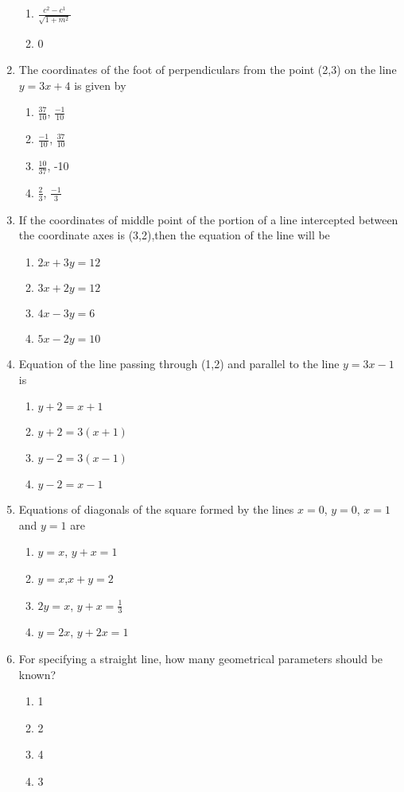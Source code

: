 \documentclass[12pt]{article}
\begin{document}
\begin{enumerate}[resume]
\begin{enumerate}
\item $\frac{c^2-c^1}{\sqrt{1+m^2}}$
\item 0
\end{enumerate}
\item The coordinates of the foot of perpendiculars from the point (2,3) on the line $y=3x+4$ is given by 
\begin{enumerate} 
\item $\frac{37}{10}$, $\frac{-1}{10}$
\item $\frac{-1}{10}$, $\frac{37}{10}$
\item $\frac{10}{37}$, -10
\item $\frac{2}{3}$, $\frac{-1}{3}$
\end{enumerate}
\item If the coordinates of middle point of the portion of a line intercepted between the coordinate axes is (3,2),then the equation of the line will be
\begin{enumerate}
\item $2x+3y=12$
\item $3x+2y=12$
\item $4x-3y=6$
\item $5x-2y=10$
\end{enumerate}
\item Equation of the line passing through (1,2) and parallel to the line $y=3x-1$ is
\begin{enumerate}
\item $y+2=x+1$
\item $y+2=3(x+1)$
\item $y-2=3(x-1)$
\item $y-2=x-1$
\end{enumerate}
\item Equations of diagonals of the square formed by the lines $x=0$, $y=0$, $x=1$ and $y=1$ are
\begin{enumerate}
\item $y=x$, $y+x=1$
\item $y=x$,$x+y=2$
\item $2y=x$, $y+x=\frac{1}{3}$
\item $y=2x$, $y+2x=1$
\end{enumerate}
\item For specifying a straight line, how many geometrical parameters should be known?
\begin{enumerate}
\item 1
\item 2
\item 4
\item 3

\end{enumerate}
\end{enumerate}
\end{document}
